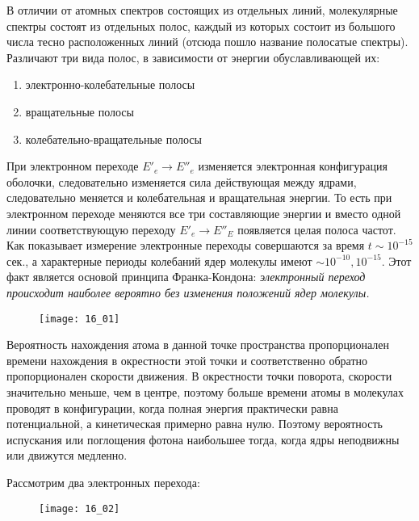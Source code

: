 
В отличии от атомных спектров состоящих из отдельных линий, молекулярные 
спектры состоят из отдельных полос, каждый из которых состоит из большого 
числа тесно расположенных линий (отсюда пошло название полосатые спектры). 
Различают три вида полос, в зависимости от энергии обуславливающей их:
\begin{enumerate}
    \item электронно-колебательные полосы
    \item вращательные полосы
    \item колебательно-вращательные полосы
\end{enumerate}

При электронном переходе \( E'_e \rightarrow E''_e \) изменяется 
электронная конфигурация оболочки, следовательно изменяется сила 
действующая между ядрами, следовательно меняется и колебательная и 
вращательная энергии. То есть при электронном переходе меняются все три 
составляющие энергии и вместо одной линии соответствующую переходу 
\( E'_e \rightarrow E''_E \) появляется целая полоса частот. Как 
показывает измерение электронные переходы совершаются за время 
\( t \sim 10^{-15} \) сек., а характерные периоды колебаний ядер молекулы 
имеют \( \sim 10^{-10}, 10^{-15} \). Этот факт является основой принципа 
Франка-Кондона: \emph{электронный переход происходит наиболее вероятно без 
изменения положений ядер молекулы.} 

\begin{figure}[h!]
    \center
    \texttt{[image: 16\_01]}
\end{figure}

Вероятность нахождения атома в данной точке пространства пропорционален 
времени нахождения в окрестности этой точки и соответственно обратно 
пропорционален скорости движения. В окрестности точки поворота, скорости 
значительно меньше, чем в центре, поэтому больше времени атомы в молекулах 
проводят в конфигурации, когда полная энергия практически равна 
потенциальной, а кинетическая примерно равна нулю. Поэтому вероятность 
испускания или поглощения фотона наибольшее тогда, когда ядры неподвижны 
или движутся медленно.

Рассмотрим два электронных перехода: 
\begin{figure}[h!]
    \center
    \texttt{[image: 16\_02]}
\end{figure}

